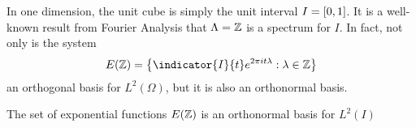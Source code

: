 \documentclass[../thesis.tex]{subfiles}
\begin{document}
In one dimension, the unit cube is simply the unit interval $I=[0,1]$. It is a well-known result from Fourier Analysis that $\Lambda = \mathbb{Z}$ is a spectrum for $I$. In fact, not only is the system
\begin{equation*}
    E(\Z) = \braqMed{\indicator{I}{t} e^{2\pi i t \lambda} : \lambda \in \Z}
\end{equation*} 
an orthogonal basis for $L^2(\Omega)$, but it is also an orthonormal basis. %
\begin{lemma}\label{lem:exp_onb_onedim}
    The set of exponential functions $E(\mathbb{Z})$ is an orthonormal basis for $L^2(I)$
\end{lemma}
\end{document}
